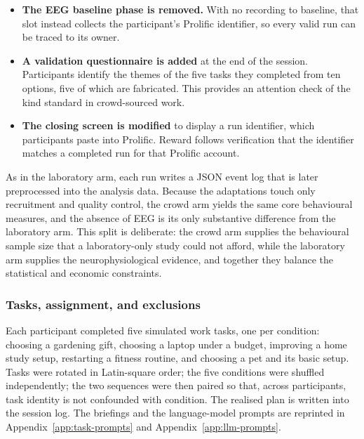 \documentclass[english]{article}
\begin{document}
\begin{itemize}
    \item \textbf{The EEG baseline phase is removed.} With no recording to baseline, that slot instead collects the participant's Prolific identifier, so every valid run can be traced to its owner.
    \item \textbf{A validation questionnaire is added} at the end of the session. Participants identify the themes of the five tasks they completed from ten options, five of which are fabricated. This provides an attention check of the kind standard in crowd-sourced work.
    \item \textbf{The closing screen is modified} to display a run identifier, which participants paste into Prolific. Reward follows verification that the identifier matches a completed run for that Prolific account.
\end{itemize}

As in the laboratory arm, each run writes a JSON event log that is later preprocessed into the analysis data. Because the adaptations touch only recruitment and quality control, the crowd arm yields the same core behavioural measures, and the absence of EEG is its only substantive difference from the laboratory arm. This split is deliberate: the crowd arm supplies the behavioural sample size that a laboratory-only study could not afford, while the laboratory arm supplies the neurophysiological evidence, and together they balance the statistical and economic constraints.

\subsubsection{Tasks, assignment, and exclusions}

Each participant completed five simulated work tasks, one per condition: choosing a gardening gift, choosing a laptop under a budget, improving a home study setup, restarting a fitness routine, and choosing a pet and its basic setup. Tasks were rotated in Latin-square order; the five conditions were shuffled independently; the two sequences were then paired so that, across participants, task identity is not confounded with condition. The realised plan is written into the session log. The briefings and the language-model prompts are reprinted in Appendix~\ref{app:task-prompts} and Appendix~\ref{app:llm-prompts}.
\end{document}
